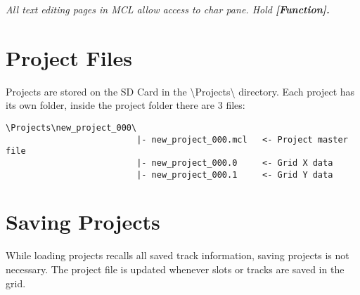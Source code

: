 \textit{All text editing pages in MCL allow access to char pane. Hold \textbf{[Function].}}

\section{Project Files}
Projects are stored on the SD Card in the \textbackslash{}Projects\textbackslash{} directory.
Each project has its own folder, inside the project folder there are 3 files:
\begin{verbatim}
\Projects\new_project_000\
                          |- new_project_000.mcl   <- Project master file
                          |- new_project_000.0     <- Grid X data
                          |- new_project_000.1     <- Grid Y data
\end{verbatim}

\section{Saving Projects}
While loading projects recalls all saved track information, saving projects is not necessary. The project file is updated whenever slots or tracks are saved in the grid.